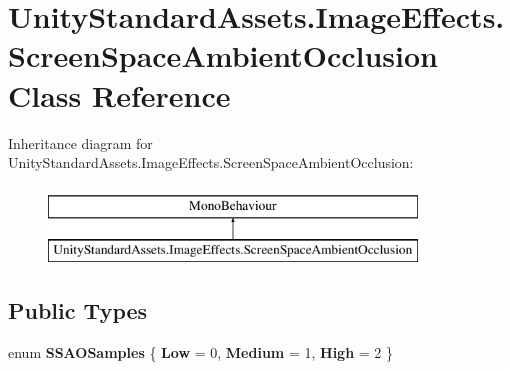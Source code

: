 \hypertarget{class_unity_standard_assets_1_1_image_effects_1_1_screen_space_ambient_occlusion}{}\section{Unity\+Standard\+Assets.\+Image\+Effects.\+Screen\+Space\+Ambient\+Occlusion Class Reference}
\label{class_unity_standard_assets_1_1_image_effects_1_1_screen_space_ambient_occlusion}
Inheritance diagram for Unity\+Standard\+Assets.\+Image\+Effects.\+Screen\+Space\+Ambient\+Occlusion\+:\begin{figure}[H]
\begin{center}
\leavevmode
\includegraphics[height=2.000000cm]{class_unity_standard_assets_1_1_image_effects_1_1_screen_space_ambient_occlusion}
\end{center}
\end{figure}
\subsection*{Public Types}
\begin{DoxyCompactItemize}
\item 
enum {\bfseries S\+S\+A\+O\+Samples} \{ {\bfseries Low} = 0, 
{\bfseries Medium} = 1, 
{\bfseries High} = 2
 \}\hypertarget{class_unity_standard_assets_1_1_image_effects_1_1_screen_space_ambient_occlusion_ad3f9892497dd8bf8570c4e61584f3df0}{}\label{class_unity_standard_assets_1_1_image_effects_1_1_screen_space_ambient_occlusion_ad3f9892497dd8bf8570c4e61584f3df0}

\end{DoxyCompactItemize}
